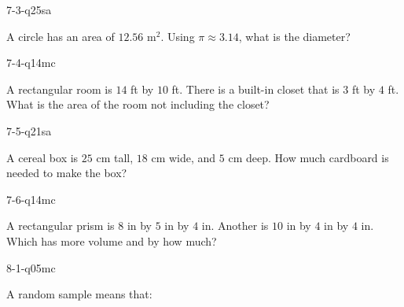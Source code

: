 \begin{practiceQuestion}{7-3-q25}{sa}
\begin{questionText}
A circle has an area of $12.56$ m$^2$. Using $\pi \approx 3.14$, what is the diameter?
\end{questionText}
\end{practiceQuestion}

\begin{practiceQuestion}{7-4-q14}{mc}
\begin{questionText}
A rectangular room is $14$ ft by $10$ ft. There is a built-in closet that is $3$ ft by $4$ ft. What is the area of the room not including the closet?
\end{questionText}
\end{practiceQuestion}

\begin{practiceQuestion}{7-5-q21}{sa}
\begin{questionText}
A cereal box is $25$ cm tall, $18$ cm wide, and $5$ cm deep. How much cardboard is needed to make the box?
\end{questionText}
\end{practiceQuestion}

\begin{practiceQuestion}{7-6-q14}{mc}
\begin{questionText}
A rectangular prism is $8$ in by $5$ in by $4$ in. Another is $10$ in by $4$ in by $4$ in. Which has more volume and by how much?
\end{questionText}
\end{practiceQuestion}

\begin{practiceQuestion}{8-1-q05}{mc}
\begin{questionText}
A random sample means that:
\end{questionText}
\end{practiceQuestion}

